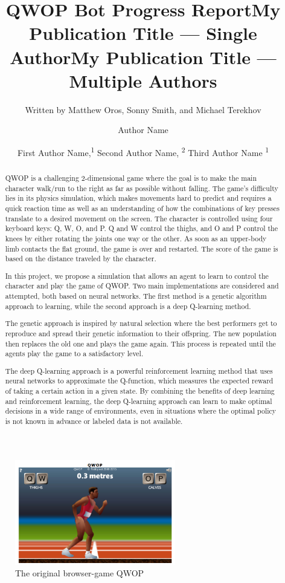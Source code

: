 \documentclass[letterpaper]{article} %
\title{QWOP Bot Progress Report}
\author{
    Written by Matthew Oros, Sonny Smith, and Michael Terekhov \\ 
}
\title{My Publication Title --- Single Author}
\author {
    Author Name \\
}
\title{My Publication Title --- Multiple Authors}
\author {
    First Author Name,\textsuperscript{\rm 1}
    Second Author Name, \textsuperscript{\rm 2}
    Third Author Name \textsuperscript{\rm 1} \\
}
\begin{document}
\maketitle

\begin{abstract}

QWOP is a challenging 2-dimensional game where the goal is to make the main character walk/run to the right as far as possible without falling. The game's difficulty lies in its physics simulation, which makes movements hard to predict and requires a quick reaction time as well as an understanding of how the combinations of key presses translate to a desired movement on the screen. The character is controlled using four keyboard keys: Q, W, O, and P. Q and W control the thighs, and O and P control the knees by either rotating the joints one way or the other. As soon as an upper-body limb contacts the flat ground, the game is over and restarted. The score of the game is based on the distance traveled by the character.

\par In this project, we propose a simulation that allows an agent to learn to control the character and play the game of QWOP. Two main implementations are considered and attempted, both based on neural networks. The first method is a genetic algorithm approach to learning, while the second approach is a deep Q-learning method.

\par The genetic approach is inspired by natural selection where the best performers get to reproduce and spread their genetic information to their offspring. The new population then replaces the old one and plays the game again. This process is repeated until the agents play the game to a satisfactory level.

\par The deep Q-learning approach is a powerful reinforcement learning method that uses neural networks to approximate the Q-function, which measures the expected reward of taking a certain action in a given state. By combining the benefits of deep learning and reinforcement learning, the deep Q-learning approach can learn to make optimal decisions in a wide range of environments, even in situations where the optimal policy is not known in advance or labeled data is not available.

\end{abstract}

\begin{figure}[h]
\caption{The original browser-game QWOP}
\centering
\includegraphics[width=7cm]{qwop.png}
\end{figure}
\end{document}
